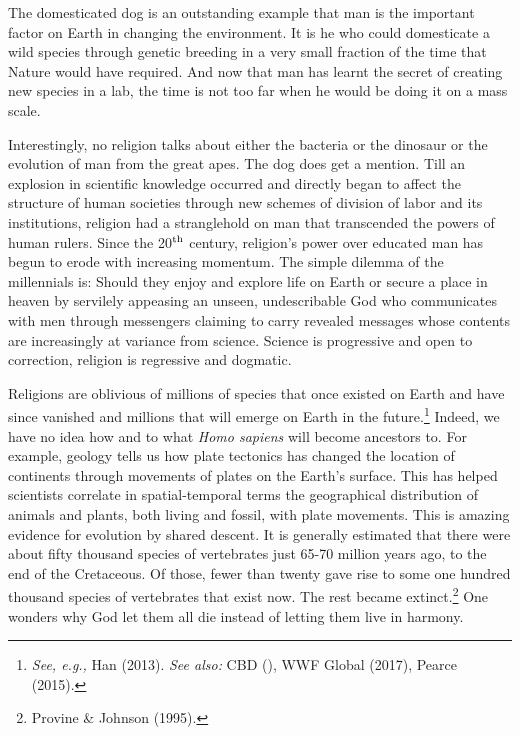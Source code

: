 \begin{multicols}{2}
The domesticated dog is an outstanding example that man is the important factor on Earth in changing the environment. It is he who could domesticate a wild species through genetic breeding in a very small fraction of the time that Nature would have required. And now that man has learnt the secret of creating new species in a lab, the time is not too far when he would be doing it on a mass scale.

Interestingly, no religion talks about either the bacteria or the dinosaur or the evolution of man from the great apes. The dog does get a mention. Till an explosion in scientific knowledge occurred and directly began to affect the structure of human societies through new schemes of division of labor and its institutions, religion had a stranglehold on man that transcended the powers of human rulers. Since the 20$^{\rm{ th}}$ century, religion's power over educated man has begun to erode with increasing momentum. The simple dilemma of the millennials is: Should they enjoy and explore life on Earth or secure a place in heaven by servilely appeasing an unseen, undescribable God who communicates with men through messengers claiming to carry revealed messages whose contents are increasingly at variance from science. Science is progressive and open to correction, religion is regressive and dogmatic.

Religions are oblivious of millions of species that once existed on Earth and have since vanished and millions that will emerge on Earth in the future.\footnote{\textit{See, e.g.,} Han (2013). \textit{See also:} CBD (), WWF Global (2017), Pearce (2015).} Indeed, we have no idea how and to what \textit{Homo sapiens} will become ancestors to. For example, geology tells us how plate tectonics has changed the location of continents through movements of plates on the Earth's surface. This has helped scientists correlate in spatial-temporal terms the geographical distribution of animals and plants, both living and fossil, with plate movements. This is amazing evidence for evolution by shared descent. It is generally estimated that there were about fifty thousand species of vertebrates just 65-70 million years ago, to the end of the Cretaceous. Of those, fewer than twenty gave rise to some one hundred thousand species of vertebrates that exist now. The rest became extinct.\footnote{Provine \& Johnson (1995).}  One wonders why God let them all die instead of letting them live in harmony.


\end{multicols}
